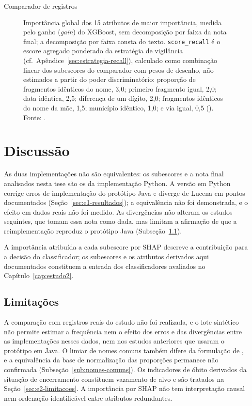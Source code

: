 \begin{chapter}{Comparador de registros}
\begin{figure}[!ht]
\centering
\resizebox{0.92\textwidth}{!}{}
\caption{Importância global dos 15 atributos de maior importância, medida pelo ganho (\textit{gain}) do XGBoost, sem decomposição por faixa da nota final; a decomposição por faixa consta do texto. \texttt{score\_recall} é o escore agregado ponderado da estratégia de vigilância (cf.\ Apêndice~\ref{sec:estrategia-recall}), calculado como combinação linear dos subescores do comparador com pesos de desenho, não estimados a partir do poder discriminatório: proporção de fragmentos idênticos do nome, 3{,}0; primeiro fragmento igual, 2{,}0; data idêntica, 2{,}5; diferença de um dígito, 2{,}0; fragmentos idênticos do nome da mãe, 1{,}5; município idêntico, 1{,}0; e via igual, 0{,}5 (\protect{}). Fonte: \protect{}.}
\label{fig:feature-importance-heatmap}
\end{figure}

\section{Discussão}\label{sec:e1-discussao}

As duas implementações não são equivalentes: os subescores e a nota final analisados nesta tese são os da implementação Python. A versão em Python corrige erros de implementação do protótipo Java e diverge de Lucena em pontos documentados (Seção~\ref{sec:e1-resultados}); a equivalência não foi demonstrada, e o efeito em dados reais não foi medido. As divergências não alteram os estudos seguintes, que tomam essa nota como dada, mas limitam a afirmação de que a reimplementação reproduz o protótipo Java (Subseção~\ref{sec:e1-limitacoes}).

A importância atribuída a cada subescore por SHAP descreve a contribuição para a decisão do classificador; os subescores e os atributos derivados aqui documentados constituem a entrada dos classificadores avaliados no Capítulo~\ref{cap:estudo2}.

\subsection{Limitações}\label{sec:e1-limitacoes}

A comparação com registros reais do estudo não foi realizada, e o lote sintético não permite estimar a frequência nem o efeito dos erros e das divergências entre as implementações nesses dados, nem nos estudos anteriores que usaram o protótipo em Java. O limiar de nomes comuns também difere da formulação de , e a equivalência da base de normalização das proporções permanece não confirmada (Subseção~\ref{sub:nomes-comuns}). Os indicadores de óbito derivados da situação de encerramento constituem vazamento de alvo e são tratados na Seção~\ref{sec:e2-limitacoes}. A importância por SHAP não tem interpretação causal nem ordenação identificável entre atributos redundantes.

\end{chapter}
